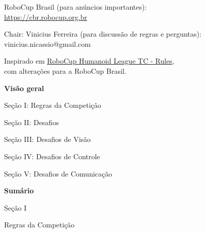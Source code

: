 \documentclass[a4paper]{article}
\begin{document}
    \bigskip
    RoboCup Brasil (para anúncios importantes):\\
    \url{https://cbr.robocup.org.br}

    \medskip
    Chair: Vinicius Ferreira (para discussão de regras e perguntas):\\
    vinicius.nicassio@gmail.com


    \medskip
    Inspirado em \href{https://github.com/RoboCup-Humanoid-TC/Rules}{\textcolor[rgb]{0,0,0.5 }{RoboCup Humanoid League TC - Rules}},\\
    com alterações para a RoboCup Brasil.

    \setcounter{figure}{0}

    \clearpage

    {\bfseries\color[rgb]{0.4,0.4,0.4}
    Visão geral}

    \bigskip

    Seção I: Regras da Competição

    \bigskip

    Seção II: Desafios
    
    \bigskip

    Seção III: Desafios de Visão

    \bigskip

    Seção IV: Desafios de Controle
    
    \bigskip

    Seção V: Desafios de Comunicação

    \clearpage

    {\bfseries\color[rgb]{0.4,0.4,0.4}
    Sumário}

    \renewcommand\contentsname{}
    \vspace*{-1cm}
    \tableofcontents



    \clearpage

    \begin{center}
        \Huge\bfseries{
            \vspace*{3cm}
            Seção I

            \vspace*{2cm}

            Regras da Competição}
    \end{center}
\end{document}
